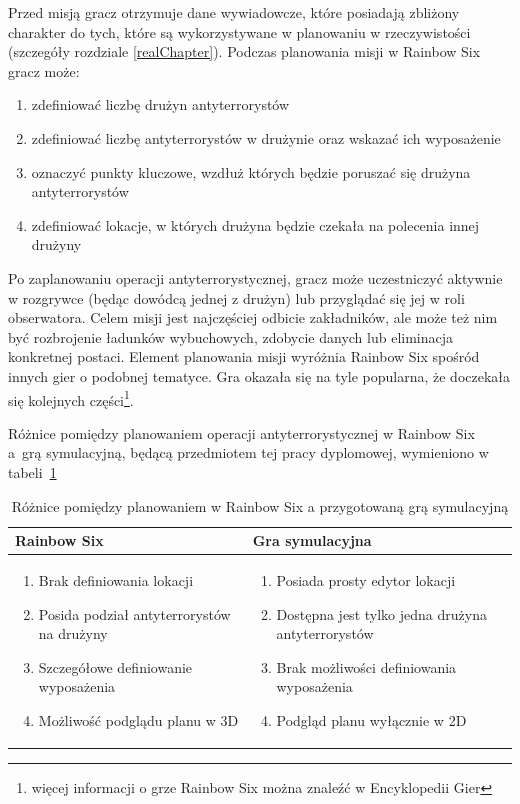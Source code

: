 Przed misją gracz otrzymuje dane wywiadowcze, które posiadają zbliżony charakter do tych, które są wykorzystywane w planowaniu w rzeczywistości (szczegóły rozdziale \ref{realChapter}). Podczas planowania misji w Rainbow Six gracz może:
\begin{enumerate}
	\item zdefiniować liczbę drużyn antyterrorystów
	\item zdefiniować liczbę antyterrorystów w drużynie oraz wskazać ich wyposażenie	
	\item oznaczyć punkty kluczowe, wzdłuż których będzie poruszać się drużyna antyterrorystów
	\item zdefiniować lokacje, w których drużyna będzie czekała na polecenia innej drużyny
\end{enumerate}

Po zaplanowaniu operacji antyterrorystycznej, gracz może uczestniczyć aktywnie w rozgrywce (będąc dowódcą jednej z drużyn) lub przyglądać się jej w roli obserwatora. Celem misji jest najczęściej odbicie zakładników, ale może też nim być rozbrojenie ładunków wybuchowych, zdobycie danych lub eliminacja konkretnej postaci. Element planowania misji wyróżnia Rainbow Six spośród innych gier o podobnej tematyce. Gra okazała się na tyle popularna, że doczekała się kolejnych części\footnote{więcej informacji o grze Rainbow Six można znaleźć w Encyklopedii Gier\cite{rainbowSix}}.

Różnice pomiędzy planowaniem operacji antyterrorystycznej w Rainbow Six a~grą symulacyjną, będącą przedmiotem tej pracy dyplomowej, wymieniono w tabeli~\ref{diffTab}

\begin{table}
\begin{center}
\begin{tabular}{p{} p{}}
Rainbow Six & Gra symulacyjna\\\hline
	\begin{enumerate}
		\setlength\itemsep{0pt}
		\item Brak definiowania lokacji
		\item Posida podział antyterrorystów na drużyny	
		\item Szczegółowe definiowanie wyposażenia 	
		\item Możliwość podglądu planu w 3D			
	\end{enumerate}&\begin{enumerate}
		\setlength\itemsep{0pt}
		\item Posiada prosty edytor lokacji
		\item Dostępna jest tylko jedna drużyna antyterrorystów
		\item Brak możliwości definiowania wyposażenia
		\item Podgląd planu wyłącznie w 2D
	\end{enumerate}
\end{tabular}
\caption {Różnice pomiędzy planowaniem w Rainbow Six a przygotowaną grą symulacyjną\label{diffTab}}
\end{center}
\end{table} 

